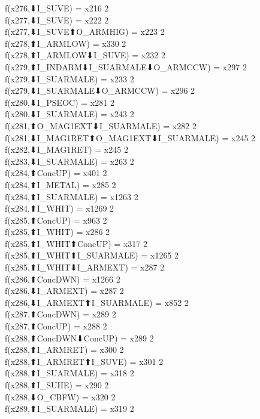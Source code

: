 f(x276,⬇I_SUVE) = x216 {2} \\
f(x277,⬇I_SUVE) = x222 {2} \\
f(x277,⬇I_SUVE⬆O_ARMHIG) = x223 {2} \\
f(x278,⬆I_ARMLOW) = x330 {2} \\
f(x278,⬆I_ARMLOW⬇I_SUVE) = x232 {2} \\
f(x279,⬆I_INDARM⬇I_SUARMALE⬇O_ARMCCW) = x297 {2} \\
f(x279,⬇I_SUARMALE) = x233 {2} \\
f(x279,⬇I_SUARMALE⬇O_ARMCCW) = x296 {2} \\
f(x280,⬇I_PSEOC) = x281 {2} \\
f(x280,⬇I_SUARMALE) = x243 {2} \\
f(x281,⬆O_MAG1EXT⬇I_SUARMALE) = x282 {2} \\
f(x281,⬇I_MAG1RET⬆O_MAG1EXT⬇I_SUARMALE) = x245 {2} \\
f(x282,⬇I_MAG1RET) = x245 {2} \\
f(x283,⬇I_SUARMALE) = x263 {2} \\
f(x284,⬆ConcUP) = x401 {2} \\
f(x284,⬆I_METAL) = x285 {2} \\
f(x284,⬆I_SUARMALE) = x1263 {2} \\
f(x284,⬆I_WHIT) = x1269 {2} \\
f(x285,⬆ConcUP) = x963 {2} \\
f(x285,⬆I_WHIT) = x286 {2} \\
f(x285,⬆I_WHIT⬆ConcUP) = x317 {2} \\
f(x285,⬆I_WHIT⬆I_SUARMALE) = x1265 {2} \\
f(x285,⬆I_WHIT⬇I_ARMEXT) = x287 {2} \\
f(x286,⬆ConcDWN) = x1266 {2} \\
f(x286,⬇I_ARMEXT) = x287 {2} \\
f(x286,⬇I_ARMEXT⬆I_SUARMALE) = x852 {2} \\
f(x287,⬆ConcDWN) = x289 {2} \\
f(x287,⬆ConcUP) = x288 {2} \\
f(x288,⬆ConcDWN⬇ConcUP) = x289 {2} \\
f(x288,⬆I_ARMRET) = x300 {2} \\
f(x288,⬆I_ARMRET⬆I_SUVE) = x301 {2} \\
f(x288,⬆I_SUARMALE) = x318 {2} \\
f(x288,⬆I_SUHE) = x290 {2} \\
f(x288,⬇O_CBFW) = x320 {2} \\
f(x289,⬆I_SUARMALE) = x319 {2} \\
